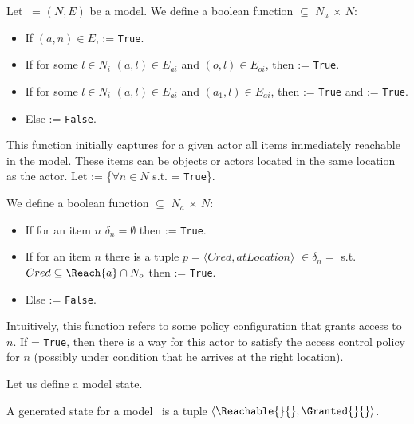 \documentclass{llncs}
\begin{document}
\begin{definition}[\Reachable{}{}]	
Let \model\ = $(N,E)$ be a model. We define a boolean function \Reachable{}{} $\subseteq$ $N_a$ $\times$ $N$:
\begin{itemize}
\item If $(a,n) \in E$,  := \texttt{True}.
\item If for some $l \in N_i$ $(a,l) \in E_{ai}$ and $(o,l) \in E_{oi}$, then  := \texttt{True}. 
\item If for some $l \in N_i$ $(a,l) \in E_{ai}$ and $(a_1,l) \in E_{ai}$, then  := \texttt{True} and  := \texttt{True}. 

\item Else  := \texttt{False}.	
\end{itemize}
\end{definition}

This function initially captures for a given actor all items immediately reachable in the model. These items can be objects or actors located in the same location as the actor. Let  := \{$\forall n \in N$ s.t.  = \texttt{True}\}.


\begin{definition}[\Granted{}{}]
We define a boolean function \Granted{}{} $\subseteq$ $N_a$ $\times$ $N$:
\begin{itemize}
\item If for an item $n$ $\delta_n = \emptyset $ then  := \texttt{True}.
\item If for an item $n$ there is a tuple $p = \langle Cred, atLocation\rangle$ $\in \delta_n =$ s.t. $Cred \subseteq \Reach{a} \cap N_o$ then  := \texttt{True}.
\item Else  := \texttt{False}.
\end{itemize}
\end{definition}

Intuitively, this function refers to some policy configuration that grants access to $n$. If  = \texttt{True}, then there is a way for this actor to satisfy the access control policy for $n$ (possibly under condition that he arrives at the right location). 

Let us define a model state.
\begin{definition}[State]
A generated state for a model \model\ is a tuple $\langle \Reachable{}{}, \Granted{}{} \rangle$.	 
\end{definition}
\end{document}
